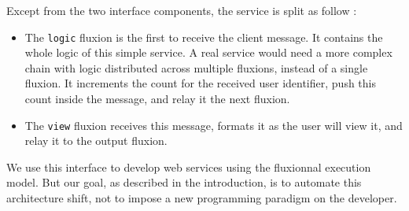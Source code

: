 Except from the two interface components, the service is split as follow :
\begin{itemize}
  \item The \texttt{logic} fluxion is the first to receive the client message.
  It contains the whole logic of this simple service.
  A real service would need a more complex chain with logic distributed across multiple fluxions, instead of a single fluxion.
  It increments the count for the received user identifier, push this count inside the message, and relay it the next fluxion.
  \item The \texttt{view} fluxion receives this message, formats it as the user will view it, and relay it to the output fluxion.
\end{itemize}

We use this interface to develop web services using the fluxionnal execution model.
But our goal, as described in the introduction, is to automate this architecture shift, not to impose a new programming paradigm on the developer.


